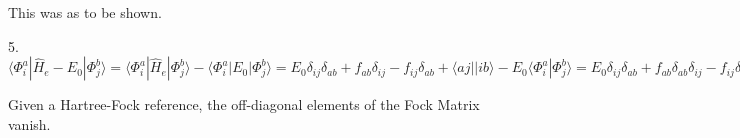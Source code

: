 \documentclass{article}
\begin{document}
This was as to be shown.

5. $\langle \Phi_i^a | \hat{H}_e - E_0 | \Phi_j^b \rangle = \langle \Phi_i^a | \hat{H}_e | \Phi_j^b \rangle - \langle \Phi_i^a | E_0 | \Phi_j^b \rangle = E_0 \delta_{ij} \delta_{ab} + f_{ab} \delta_{ij} - f_{ij} \delta_{ab} + \langle aj || ib \rangle  - E_0 \langle \Phi_i^a | \Phi_j^b \rangle = E_0 \delta_{ij} \delta_{ab} + f_{ab} \delta_{ab}\delta_{ij} - f_{ij} \delta_{ab}\delta_{ij} + \langle aj || ib \rangle  - E_0 \delta_{ij} \delta_{ab} = (\epsilon_a - \epsilon_i) \delta_{ab}\delta_{ij} + \langle aj || ib \rangle$

Given a Hartree-Fock reference, the off-diagonal elements of the Fock Matrix vanish. \\
\end{document}
